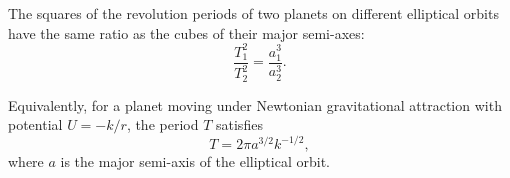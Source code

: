 The squares of the revolution periods of two planets on different elliptical orbits have the same ratio as the cubes of their major semi-axes:
$$\frac{T_1^2}{T_2^2} = \frac{a_1^3}{a_2^3}.$$

Equivalently, for a planet moving under Newtonian gravitational attraction with potential $U = -k/r$, the period $T$ satisfies
$$T = 2\pi a^{3/2} k^{-1/2},$$
where $a$ is the major semi-axis of the elliptical orbit.
